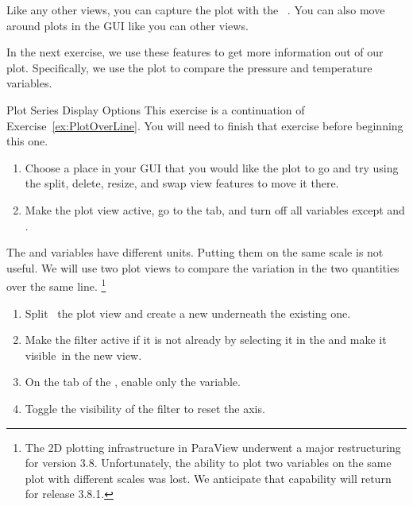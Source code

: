 Like any other views, you can capture the plot with the  \ra
{}~.
You can also move around plots in the GUI like you can other views.

In the next exercise, we use these features to get more information out of
our plot.  Specifically, we use the plot to compare the pressure and
temperature variables.

\begin{exercise}{Plot Series Display Options}
  \label{ex:PlotSeriesDisplayOptions}%
  This exercise is a continuation of Exercise~\ref{ex:PlotOverLine}.  You
  will need to finish that exercise before beginning this one.

  \begin{enumerate}
  \item Choose a place in your GUI that you would like the plot to go and
    try using the split, delete, resize, and swap view features to move it
    there.
  \item Make the plot view active, go to the  tab, and turn
    off all variables except  and .
    \savecounter
  \end{enumerate}

  The  and  variables have different units.  Putting
  them on the same scale is not useful.  %
  We will use two plot views to compare the variation in the two
  quantities over the same line.%
  \footnote{The 2D plotting infrastructure in ParaView underwent a major
    restructuring for version 3.8. Unfortunately, the ability to plot
    two variables on the same plot with different scales was lost. We
    anticipate that capability will return for release 3.8.1.}

  \begin{enumerate}
    \restorecounter
  \item Split~ the plot view and create a new
     underneath the existing one.
  \item Make the  filter active if it is not already by
    selecting it in the  and make it
    visible~\eyeball in the new view.
  \item On the  tab of the , enable
    only the  variable.
  \item Toggle the visibility of the  filter to
    reset the axis.
  \end{enumerate}


\end{exercise}
